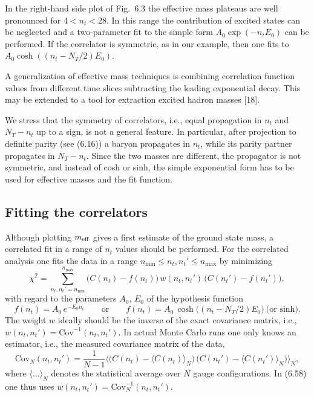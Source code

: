 In the right-hand side plot of Fig.~6.3 the effective mass plateaus are well
pronounced for $4 < n_t < 28$. In this range the contribution of excited states
can be neglected and a two-parameter fit to the simple form
$A_0 \exp(-n_t E_0)$ can be performed. If the correlator is symmetric, as in
our example, then one fits to $A_0 \cosh((n_t - N_T/2) E_0)$.

A generalization of effective mass techniques is combining correlation function
values from different time slices subtracting the leading exponential decay.
This may be extended to a tool for extraction excited hadron masses [18].

We stress that the symmetry of correlators, i.e., equal propagation in $n_t$ and
$N_T - n_t$ up to a sign, is not a general feature. In particular, after
projection to definite parity (see (6.16)) a baryon propagates in $n_t$, while
its parity partner propagates in $N_T - n_t$. Since the two masses are
different, the propagator is not symmetric, and instead of cosh or sinh, the
simple exponential form has to be used for effective masses and the fit
function.

\subsection{Fitting the correlators}

Although plotting $m_{\rm eff}$ gives a first estimate of the ground state
mass, a correlated fit in a range of $n_t$ values should be performed. For the
correlated analysis one fits the data in a range $n_{\min} \leq n_t, n_t' \leq
n_{\max}$ by minimizing
\begin{equation}
  \chi^2 = \sum_{n_t, n_t' = n_{\min}}^{n_{\max}}
    \big( C(n_t) - f(n_t) \big)\, w(n_t, n_t')\,
    \big( C(n_t') - f(n_t') \big) ,
\end{equation}
with regard to the parameters $A_0$, $E_0$ of the hypothesis function
\begin{equation}
  f(n_t) = A_0\, e^{-E_0 n_t} \qquad \text{or} \qquad
  f(n_t) = A_0\, \cosh\!\big( (n_t - N_T/2) E_0 \big) \ \text{(or sinh)} .
\end{equation}
The weight $w$ ideally should be the inverse of the exact covariance matrix,
i.e., $w(n_t, n_t') = \mathrm{Cov}^{-1}(n_t, n_t')$. In actual Monte Carlo runs
one only knows an estimator, i.e., the measured covariance matrix of the data,
\begin{equation}
  \mathrm{Cov}_N(n_t, n_t')
  = \frac{1}{N - 1}\Big\langle
      \big( C(n_t) - \langle C(n_t)\rangle_N \big)\,
      \big( C(n_t') - \langle C(n_t')\rangle_N \big)
    \Big\rangle_N ,
\end{equation}
where $\langle\ldots\rangle_N$ denotes the statistical average over $N$ gauge
configurations. In (6.58) one thus uses
$w(n_t, n_t') = \mathrm{Cov}^{-1}_N(n_t, n_t')$.

